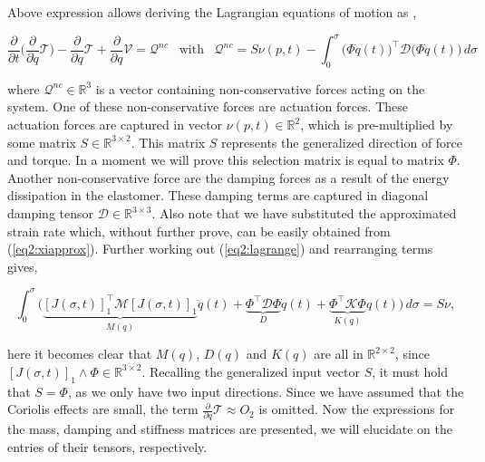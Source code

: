 Above expression allows deriving the Lagrangian equations of motion as \cite{NWouw},

\begin{equation}
    \frac{\partial}{\partial t}\Big( \frac{\partial}{\partial\dot{q}}\mathcal{T}\Big)- \frac{\partial}{\partial q}\mathcal{T} + \frac{\partial}{\partial q}\mathcal{V} = \mathcal{Q}^{nc} \hspace{10pt} \text{with} \hspace{10pt} \mathcal{Q}^{nc} =  S\nu(p,t) - \int_0^\sigma \big(\Phi\dot{q}(t)\big)^\top \mathcal{D} \big( \Phi \dot{q}(t)\big) \hspace{2pt} d \sigma
    \label{eq2:lagrange}
\end{equation}

where $\mathcal{Q}^{nc} \in \mathbb{R}^3$ is a vector containing non-conservative forces acting on the system. One of these non-conservative forces are actuation forces. These actuation forces are captured in vector $\nu(p,t) \in \mathbb{R}^2$, which is pre-multiplied by some matrix $S \in \mathbb{R}^{3\times 2}$. This matrix $S$ represents the generalized direction of force and torque. In a moment we will prove this selection matrix is equal to matrix $\Phi$. Another non-conservative force are the damping forces as a result of the energy dissipation in the elastomer. These damping terms are captured in diagonal damping tensor $\mathcal{D} \in \mathbb{R}^{3 \times 3}$. Also note that we have substituted the approximated strain rate which, without further prove, can be easily obtained from (\ref{eq2:xiapprox}). Further working out (\ref{eq2:lagrange}) and rearranging terms gives,

\begin{equation}
    \int_0^\sigma \Big( \underbrace{[J(\sigma,t)]_1^\top \mathcal{M} [J(\sigma,t)]_1}_{M(q)} \ddot{q}(t) +  \underbrace{\Phi^\top \mathcal{D} \Phi }_{D} \dot{q}(t)    +   \underbrace{\Phi^\top \mathcal{K} \Phi}_{K(q)} q(t)\Big) \hspace{2pt} d\sigma = S\nu,
\end{equation}

here it becomes clear that $M(q)$, $D(q)$ and $K(q)$ are all in $\mathbb{R}^{2\times2}$, since $[J(\sigma,t)]_1 \land \Phi \in \mathbb{R}^{3 \times 2}$. Recalling the generalized input vector $S$, it must hold that $S = \Phi$, as we only have two input directions. Since we have assumed that the Coriolis effects are small, the term $\frac{\partial}{\partial q}\mathcal{T} \approx O_2 $ is omitted. Now the expressions for the mass, damping and stiffness matrices are presented, we will elucidate on the entries of their tensors, respectively.

